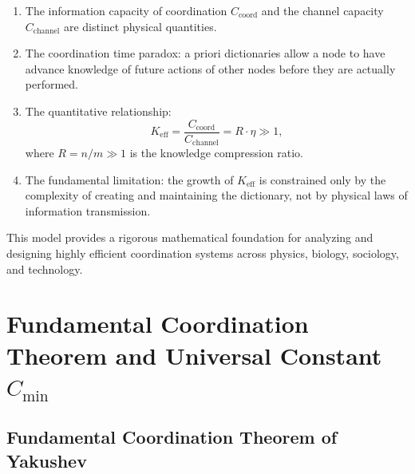 \documentclass[11pt,a4paper]{article}
\begin{document}
\begin{enumerate}
	\item The information capacity of coordination $C_{\text{coord}}$ and the channel capacity $C_{\text{channel}}$ are distinct physical quantities.
	
	\item The coordination time paradox: a priori dictionaries allow a node to have advance knowledge of future actions of other nodes before they are actually performed.
	
	\item The quantitative relationship:
	\[
	K_{\mathrm{eff}} = \frac{C_{\text{coord}}}{C_{\text{channel}}} = R \cdot \eta \gg 1,
	\]
	where $R = n/m \gg 1$ is the knowledge compression ratio.
	
	\item The fundamental limitation: the growth of $K_{\mathrm{eff}}$ is constrained only by the complexity of creating and maintaining the dictionary, not by physical laws of information transmission.
\end{enumerate}

This model provides a rigorous mathematical foundation for analyzing and designing highly efficient coordination systems across physics, biology, sociology, and technology.


\section{Fundamental Coordination Theorem and Universal Constant \texorpdfstring{$C_{\min}$}{C\_min}}
\label{sec:fundamental-theorem}

\subsection{Fundamental Coordination Theorem of Yakushev}
\end{document}
